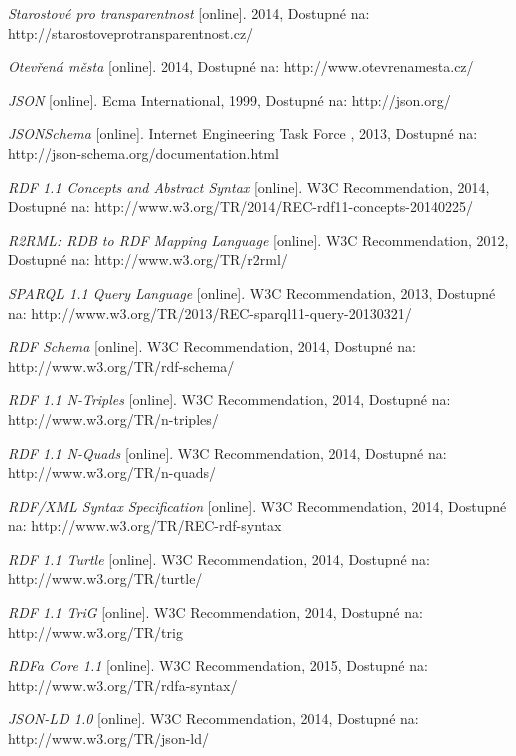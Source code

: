 \begin{thebibliography}{99}
  \emph{Starostové pro transparentnost} 
  [online]. 2014, Dostupné na: 
  http://starostoveprotransparentnost.cz/
  
  \emph{Otevřená města} 
  [online]. 2014, Dostupné na: 
  http://www.otevrenamesta.cz/  
 
  \emph{JSON} 
  [online]. Ecma International, 1999, Dostupné na: 
  http://json.org/
  
  \emph{JSONSchema} 
  [online]. Internet Engineering Task Force , 2013, Dostupné na: 
  http://json-schema.org/documentation.html   
  
  \emph{RDF 1.1 Concepts and Abstract Syntax} 
  [online]. W3C Recommendation, 2014, Dostupné na: 
  http://www.w3.org/TR/2014/REC-rdf11-concepts-20140225/
  
  \emph{R2RML: RDB to RDF Mapping Language} 
  [online]. W3C Recommendation, 2012, Dostupné na: 
  http://www.w3.org/TR/r2rml/
  
  \emph{SPARQL 1.1 Query Language} 
  [online]. W3C Recommendation, 2013, Dostupné na: 
  http://www.w3.org/TR/2013/REC-sparql11-query-20130321/
  
  \emph{RDF Schema} 
  [online]. W3C Recommendation, 2014, Dostupné na: 
  http://www.w3.org/TR/rdf-schema/ 
  
  \emph{RDF 1.1 N-Triples} 
  [online]. W3C Recommendation, 2014, Dostupné na: 
  http://www.w3.org/TR/n-triples/ 
  
  \emph{RDF 1.1 N-Quads} 
  [online]. W3C Recommendation, 2014, Dostupné na: 
  http://www.w3.org/TR/n-quads/ 

  \emph{RDF/XML Syntax Specification} 
  [online]. W3C Recommendation, 2014, Dostupné na: 
  http://www.w3.org/TR/REC-rdf-syntax 
  
  \emph{RDF 1.1 Turtle} 
  [online]. W3C Recommendation, 2014, Dostupné na: 
  http://www.w3.org/TR/turtle/

  \emph{RDF 1.1 TriG} 
  [online]. W3C Recommendation, 2014, Dostupné na: 
  http://www.w3.org/TR/trig
  
  \emph{RDFa Core 1.1} 
  [online]. W3C Recommendation, 2015, Dostupné na: 
  http://www.w3.org/TR/rdfa-syntax/
  
  \emph{JSON-LD 1.0} 
  [online]. W3C Recommendation, 2014, Dostupné na: 
  http://www.w3.org/TR/json-ld/


\end{thebibliography}
